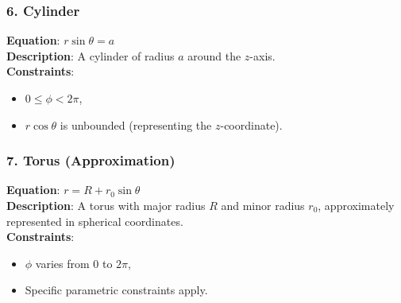 \documentclass{report}
\begin{document}
\begin{multicols}{2}
\subsubsection{6. Cylinder}
\textbf{Equation}: \(r \sin\theta = a\) \\
\textbf{Description}: A cylinder of radius \(a\) around the \(z\)-axis. \\
\textbf{Constraints}:
\begin{itemize}
    \item \(0 \leq \phi < 2\pi\),
    \item \(r \cos\theta\) is unbounded (representing the \(z\)-coordinate).
\end{itemize}

\begin{center}
	\end{center}


\subsubsection{7. Torus (Approximation)}
\textbf{Equation}: \(r = R + r_0 \sin\theta\) \\
\textbf{Description}: A torus with major radius \(R\) and minor radius \(r_0\), approximately represented in spherical coordinates. \\
\textbf{Constraints}:
\begin{itemize}
    \item \(\phi\) varies from \(0\) to \(2\pi\),
    \item Specific parametric constraints apply.
\end{itemize}
\begin{center}
	\end{center}



\end{multicols}
\end{document}
